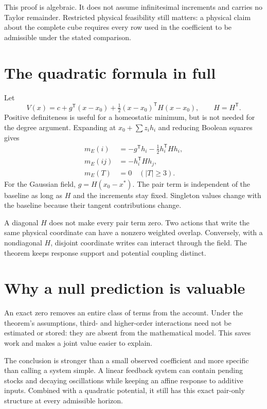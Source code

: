 This proof is algebraic. It does not assume infinitesimal increments and carries no Taylor remainder. Restricted physical feasibility still matters: a physical claim about the complete cube requires every row used in the coefficient to be admissible under the stated comparison.

\section{The quadratic formula in full}
Let
\begin{equation}
 V(x)=c+g^{\mathsf T}(x-x_0)
       +\tfrac12(x-x_0)^{\mathsf T}H(x-x_0),
 \qquad H=H^{\mathsf T}.
\end{equation}
Positive definiteness is useful for a homeostatic minimum, but is not needed for the degree argument. Expanding at $x_0+\sum z_i h_i$ and reducing Boolean squares gives
\begin{align}\label{eq:quadratic-dividends}
 m_E(i)&=-g^{\mathsf T}h_i-\tfrac12h_i^{\mathsf T}Hh_i,\nonumber\\
 m_E(ij)&=-h_i^{\mathsf T}Hh_j,\\
 m_E(T)&=0\quad (|T|\geq3).\nonumber
\end{align}
For the Gaussian field, $g=H(x_0-x^*)$. The pair term is independent of the baseline as long as $H$ and the increments stay fixed. Singleton values change with the baseline because their tangent contributions change.

A diagonal $H$ does not make every pair term zero. Two actions that write the same physical coordinate can have a nonzero weighted overlap. Conversely, with a nondiagonal $H$, disjoint coordinate writes can interact through the field. The theorem keeps response support and potential coupling distinct.

\section{Why a null prediction is valuable}
An exact zero removes an entire class of terms from the account. Under the theorem's assumptions, third- and higher-order interactions need not be estimated or stored: they are absent from the mathematical model. This saves work and makes a joint value easier to explain.

The conclusion is stronger than a small observed coefficient and more specific than calling a system simple. A linear feedback system can contain pending stocks and decaying oscillations while keeping an affine response to additive inputs. Combined with a quadratic potential, it still has this exact pair-only structure at every admissible horizon.

